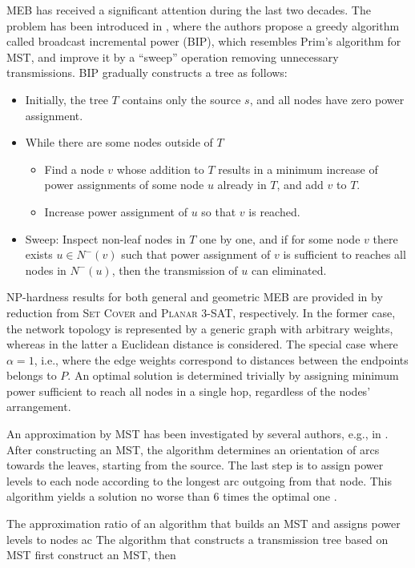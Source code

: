 MEB has received a significant attention during the last two decades.
The problem has been introduced in \cite{wieselthier00}, where the authors propose a greedy algorithm called broadcast incremental power (BIP), which resembles Prim's algorithm for MST,
and improve it by a ``sweep'' operation removing unnecessary transmissions.
BIP gradually constructs a tree as follows:
\begin{itemize}
\item Initially, the tree $T$ contains only the source $s$, and all nodes have zero power assignment.
\item While there are some nodes outside of $T$
\begin{itemize}
	\item Find a node $v$ whose addition to $T$ results in a minimum increase of power assignments of some node $u$ already in $T$, and add $v$ to $T$.
	\item Increase  power assignment of $u$ so that $v$ is reached.
\end{itemize}
\item Sweep: Inspect non-leaf nodes in $T$ one by one, and if for some node $v$ there exists $u\in N^-(v)$ such that power assignment of $v$ is sufficient to reaches all nodes in $N^-(u)$, 
then the transmission of $u$ can eliminated.
\end{itemize}

NP-hardness results for both general and geometric MEB are provided in \cite{cagalj02} by reduction from \textsc{Set Cover} and \textsc{Planar 3-SAT}, respectively.
In the former case, the network topology is represented by a generic graph with arbitrary weights, whereas in the latter a Euclidean distance is considered.
The special case where $\alpha=1$, i.e., where the edge weights correspond to distances between the endpoints belongs to $P$.
An optimal solution is determined trivially by assigning minimum power sufficient to reach all nodes in a single hop, regardless of the nodes' arrangement.

An approximation by MST has been investigated by several authors, e.g., in \cite{clementi01}.
After constructing an MST, the algorithm determines an orientation of arcs towards the leaves, starting from the source.
The last step is to assign power levels to each node according to the longest arc outgoing from that node.
This algorithm yields a solution no worse than 6 times the optimal one \cite{ambuhl05}.

The approximation ratio of an algorithm that builds an MST and assigns power levels to nodes ac
The algorithm that constructs a transmission tree based on MST first construct an MST, then 

